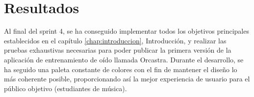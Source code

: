 \chapter{Resultados}
Al final del sprint 4, se ha conseguido implementar todos los objetivos principales establecidos en el capítulo \ref{chap:introduccion}, Introducción, y realizar las pruebas exhaustivas necesarias para poder publicar la primera versión de la aplicación de entrenamiento de oído llamada Orcastra. Durante el desarrollo, se ha seguido una paleta constante de colores con el fin de mantener el diseño lo más coherente posible, proporcionando así la mejor experiencia de usuario para el público objetivo (estudiantes de música).

